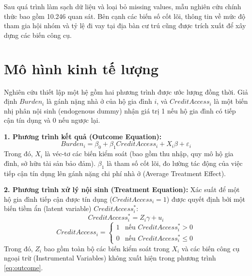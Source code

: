 \documentclass[12pt,a4paper]{report}
\begin{document}
Sau quá trình làm sạch dữ liệu và loại bỏ missing values, mẫu nghiên cứu chính thức bao gồm 10.246 quan sát. Bên cạnh các biến số cốt lõi, thông tin về mức độ tham gia hội nhóm và tỷ lệ đi vay tại địa bàn cư trú cũng được trích xuất để xây dựng các biến công cụ.


\section{Mô hình kinh tế lượng}

Nghiên cứu thiết lập một hệ gồm hai phương trình được ước lượng đồng thời. Giả định $Burden_i$ là gánh nặng nhà ở của hộ gia đình $i$, và $CreditAccess_i$ là một biến nhị phân nội sinh (endogenous dummy) nhận giá trị 1 nếu hộ gia đình có tiếp cận tín dụng và 0 nếu ngược lại.

\textbf{1. Phương trình kết quả (Outcome Equation):}
\begin{equation}
	Burden_i = \beta_0 + \beta_1 CreditAccess_i + X_i \beta + \varepsilon_i
	\label{eq:outcome}
\end{equation}
Trong đó, $X_i$ là véc-tơ các biến kiểm soát (bao gồm thu nhập, quy mô hộ gia đình, sở hữu tài sản bảo đảm). $\beta_1$ là tham số cốt lõi, đo lường tác động của việc tiếp cận tín dụng lên gánh nặng chi phí nhà ở (Average Treatment Effect).

\textbf{2. Phương trình xử lý nội sinh (Treatment Equation):}
Xác suất để một hộ gia đình tiếp cận được tín dụng ($CreditAccess_i = 1$) được quyết định bởi một biến tiềm ẩn (latent variable) $CreditAccess_i^*$:
\begin{equation}
	CreditAccess_i^* = Z_i \gamma + u_i
	\label{eq:treatment}
\end{equation}
\begin{equation}
	CreditAccess_i = 
	\begin{cases}
		1 & \text{nếu } CreditAccess_i^* > 0 \\
		0 & \text{nếu } CreditAccess_i^* \leq 0
	\end{cases}
\end{equation}
Trong đó, $Z_i$ bao gồm toàn bộ các biến kiểm soát trong $X_i$ và các biến công cụ ngoại trừ (Instrumental Variables) không xuất hiện trong phương trình \eqref{eq:outcome}. 
\end{document}
